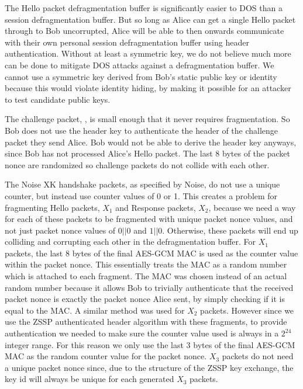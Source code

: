 \documentclass{article}
\begin{document}
The Hello packet defragmentation buffer is significantly easier to DOS than a session defragmentation buffer. But so long as Alice can get a single Hello packet through to Bob uncorrupted, Alice will be able to then onwards communicate with their own personal session defragmentation buffer using header authentication. Without at least a symmetric key, we do not believe much more can be done to mitigate DOS attacks against a defragmentation buffer. We cannot use a symmetric key derived from Bob's static public key or identity because this would violate identity hiding, by making it possible for an attacker to test candidate public keys.

The challenge packet, , is small enough that it never requires fragmentation. So Bob does not use the header key to authenticate the header of the challenge packet they send Alice. Bob would not be able to derive the header key anyways, since Bob has not processed Alice's Hello packet. The last 8 bytes of the packet nonce are randomized so challenge packets do not collide with each other.

The Noise XK handshake packets, as specified by Noise, do not use a unique counter, but instead use counter values of 0 or 1. This creates a problem for fragmenting Hello packets, $X_1$ and Response packets, $X_2$, because we need a way for each of these packets to be fragmented with unique packet nonce values, and not just packet nonce values of $0||0$ and $1||0$. Otherwise, these packets will end up colliding and corrupting each other in the defragmentation buffer. For $X_1$ packets, the last 8 bytes of the final AES-GCM MAC is used as the counter value within the packet nonce. This essentially treats the MAC as a random number which is attached to each fragment. The MAC was chosen instead of an actual random number because it allows Bob to trivially authenticate that the received packet nonce is exactly the packet nonce Alice sent, by simply checking if it is equal to the MAC. A similar method was used for $X_2$ packets. However since we use the ZSSP authenticated header algorithm with these fragments, to provide authentication we needed to make sure the counter value used is always in a $2^{24}$ integer range. For this reason we only use the last 3 bytes of the final AES-GCM MAC as the random counter value for the packet nonce. $X_3$ packets do not need a unique packet nonce since, due to the structure of the ZSSP key exchange, the key id will always be unique for each generated $X_3$ packets.
\end{document}
